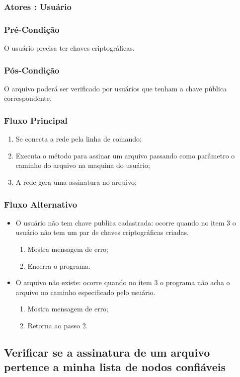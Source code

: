 \subsubsection{Atores : Usuário}
\subsubsection{Pré-Condição}
O usuário precisa ter chaves criptográficas.
\subsubsection{Pós-Condição}
O arquivo poderá ser verificado por usuários que tenham a chave pública correspondente.
\subsubsection{Fluxo Principal}
\begin{enumerate}
    \item Se conecta a rede pela linha de comando;
    \item Executa o método para assinar um arquivo passando como parâmetro o caminho do arquivo na maquina do usuário;
    \item A rede gera uma assinatura no arquivo;
\end{enumerate}
\subsubsection{Fluxo Alternativo}
\begin{itemize}
    \item O usuário não tem chave publica cadastrada: ocorre quando no item 3 o usuário não tem um par de chaves criptográficas criadas.
    \begin{enumerate}
        \item Mostra mensagem de erro;
        \item Encerra o programa.
    \end{enumerate}
     \item O arquivo não existe: ocorre quando no item 3 o programa não acha o arquivo no caminho especificado pelo usuário.
    \begin{enumerate}
        \item Mostra mensagem de erro;
        \item Retorna ao passo 2.
    \end{enumerate}
\end{itemize}


\subsection{Verificar se a assinatura de um arquivo pertence a minha lista de nodos confiáveis}
